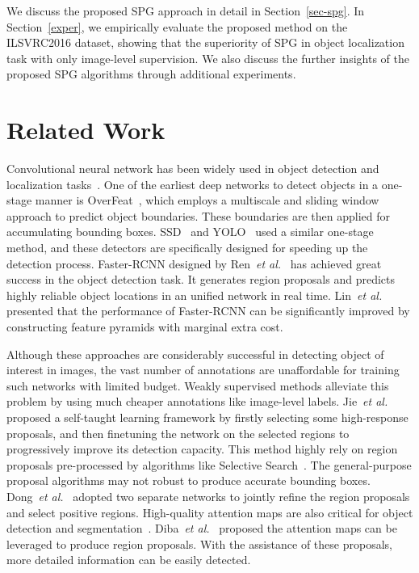 \documentclass[runningheads]{llncs}
\newcommand{\etal}{\emph{et al.}}
\begin{document}
We discuss the proposed SPG approach in detail in Section~\ref{sec-spg}.
In Section~\ref{exper}, we empirically evaluate the proposed method on the ILSVRC2016 dataset, showing that the superiority of SPG in object localization task with only image-level supervision.
We also discuss the further insights of the proposed SPG algorithms through additional experiments.
 \section{Related Work}
Convolutional neural network has been widely used in object detection and localization tasks~\cite{simonyan2014very,jiang2013salient,luo2016accurate,he2017delving,zheng2018task,cheng2018revisiting}.
One of the earliest deep networks to detect objects in a one-stage manner is OverFeat~\cite{sermanet2013overfeat}, which employs a multiscale and sliding window approach to predict object boundaries. These boundaries are then applied for accumulating bounding boxes. 
SSD~\cite{liu2016ssd} and YOLO~\cite{redmon2016you} used a similar one-stage method, and these detectors are specifically designed for speeding up the detection process.  
Faster-RCNN designed by Ren~\etal~\cite{ren2015faster} has achieved great success in the object detection task.
It generates region proposals and predicts highly reliable object locations in an unified network in real time.
Lin~\etal~\cite{lin2017feature} presented that the performance of Faster-RCNN can be significantly improved by constructing feature pyramids with marginal extra cost.


Although these approaches are considerably successful in detecting object of interest in images, the vast number of annotations are unaffordable for training such networks with limited budget.
Weakly supervised methods alleviate this problem by using much cheaper annotations like image-level labels.
Jie~\etal~\cite{jie2017deep} proposed a self-taught learning framework by firstly selecting some high-response proposals, and then finetuning the network on the selected regions to progressively improve its detection capacity.
This method highly rely on region proposals pre-processed by algorithms like Selective Search~\cite{uijlings2013selective}. 
The general-purpose proposal algorithms may not robust to produce accurate bounding boxes. Dong~\etal~\cite{dong2017dual} adopted two separate networks to jointly refine the region proposals and select positive regions.
High-quality attention maps are also critical for object detection and segmentation~\cite{luo2018Macro}.
Diba~\etal~\cite{diba2017weakly} proposed the attention maps can be leveraged to produce region proposals.
With the assistance of these proposals, more detailed information can be easily detected.
\end{document}
